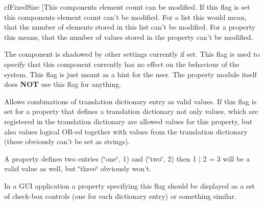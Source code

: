 \begin{Desc}
\begin{description}
{\hypertarget{group___common_interface_gga4ef1be7cf1ca9dd256fd3060dd0787bba704273740611745f698500fabcd7d4b0}{cf\+Fixed\+Size}\label{group___common_interface_gga4ef1be7cf1ca9dd256fd3060dd0787bba704273740611745f698500fabcd7d4b0}
}]This components element count can be modified. If this flag is set this components element count can't be modified. For a list this would mean, that the number of elements stored in this list can't be modified. For a property this means, that the number of values stored in the property can't be modified. \item[{\em 
\hypertarget{group___common_interface_gga4ef1be7cf1ca9dd256fd3060dd0787bba9a9d089f3b3c25fdc2a0be583b7f706d}{cf\+Invisible}\label{group___common_interface_gga4ef1be7cf1ca9dd256fd3060dd0787bba9a9d089f3b3c25fdc2a0be583b7f706d}
}]The component is shadowed by other settings currently if set. This flag is used to specify that this component currently has no effect on the behaviour of the system. This flag is just meant as a hint for the user. The property module itself does {\bfseries N\+O\+T} use this flag for anything. \item[{\em 
\hypertarget{group___common_interface_gga4ef1be7cf1ca9dd256fd3060dd0787bbae2579c0fd597f542b982e7bf8475b669}{cf\+Allow\+Value\+Combinations}\label{group___common_interface_gga4ef1be7cf1ca9dd256fd3060dd0787bbae2579c0fd597f542b982e7bf8475b669}
}]Allows combinations of translation dictionary entry as valid values. If this flag is set for a property that defines a translation dictionary not only values, which are registered in the translation dictionary are allowed values for this property, but also values logical O\+R-\/ed together with values from the translation dictionary (these obviously can't be set as strings).

A property defines two entries (\char`\"{}one\char`\"{}, 1) and (\char`\"{}two\char`\"{}, 2) then 1 $\vert$ 2 = 3 will be a valid value as well, but \char`\"{}three\char`\"{} obviously won't.

In a G\+U\+I application a property specifying this flag should be displayed as a set of check-\/box controls (one for each dictionary entry) or something similar.


\end{description}
\end{Desc}
